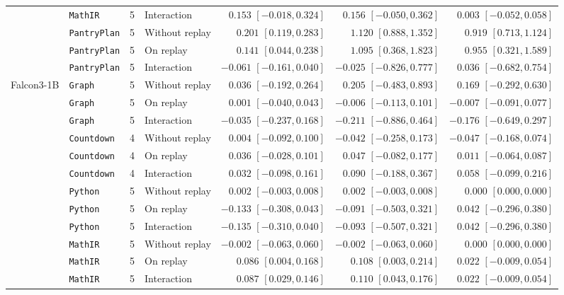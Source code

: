 \begin{table}[!htbp]
\begin{tabular}{llr l rrr}
 & \texttt{MathIR} & 5 & Interaction & $0.153$ $[-0.018, 0.324]$ & $0.156$ $[-0.050, 0.362]$ & $0.003$ $[-0.052, 0.058]$ \\
 & \texttt{PantryPlan} & 5 & Without replay & $0.201$ $[0.119, 0.283]$ & $1.120$ $[0.888, 1.352]$ & $0.919$ $[0.713, 1.124]$ \\
 & \texttt{PantryPlan} & 5 & On replay & $0.141$ $[0.044, 0.238]$ & $1.095$ $[0.368, 1.823]$ & $0.955$ $[0.321, 1.589]$ \\
 & \texttt{PantryPlan} & 5 & Interaction & $-0.061$ $[-0.161, 0.040]$ & $-0.025$ $[-0.826, 0.777]$ & $0.036$ $[-0.682, 0.754]$ \\
\midrule
Falcon3-1B & \texttt{Graph} & 5 & Without replay & $0.036$ $[-0.192, 0.264]$ & $0.205$ $[-0.483, 0.893]$ & $0.169$ $[-0.292, 0.630]$ \\
 & \texttt{Graph} & 5 & On replay & $0.001$ $[-0.040, 0.043]$ & $-0.006$ $[-0.113, 0.101]$ & $-0.007$ $[-0.091, 0.077]$ \\
 & \texttt{Graph} & 5 & Interaction & $-0.035$ $[-0.237, 0.168]$ & $-0.211$ $[-0.886, 0.464]$ & $-0.176$ $[-0.649, 0.297]$ \\
 & \texttt{Countdown} & 4 & Without replay & $0.004$ $[-0.092, 0.100]$ & $-0.042$ $[-0.258, 0.173]$ & $-0.047$ $[-0.168, 0.074]$ \\
 & \texttt{Countdown} & 4 & On replay & $0.036$ $[-0.028, 0.101]$ & $0.047$ $[-0.082, 0.177]$ & $0.011$ $[-0.064, 0.087]$ \\
 & \texttt{Countdown} & 4 & Interaction & $0.032$ $[-0.098, 0.161]$ & $0.090$ $[-0.188, 0.367]$ & $0.058$ $[-0.099, 0.216]$ \\
 & \texttt{Python} & 5 & Without replay & $0.002$ $[-0.003, 0.008]$ & $0.002$ $[-0.003, 0.008]$ & $0.000$ $[0.000, 0.000]$ \\
 & \texttt{Python} & 5 & On replay & $-0.133$ $[-0.308, 0.043]$ & $-0.091$ $[-0.503, 0.321]$ & $0.042$ $[-0.296, 0.380]$ \\
 & \texttt{Python} & 5 & Interaction & $-0.135$ $[-0.310, 0.040]$ & $-0.093$ $[-0.507, 0.321]$ & $0.042$ $[-0.296, 0.380]$ \\
 & \texttt{MathIR} & 5 & Without replay & $-0.002$ $[-0.063, 0.060]$ & $-0.002$ $[-0.063, 0.060]$ & $0.000$ $[0.000, 0.000]$ \\
 & \texttt{MathIR} & 5 & On replay & $0.086$ $[0.004, 0.168]$ & $0.108$ $[0.003, 0.214]$ & $0.022$ $[-0.009, 0.054]$ \\
 & \texttt{MathIR} & 5 & Interaction & $0.087$ $[0.029, 0.146]$ & $0.110$ $[0.043, 0.176]$ & $0.022$ $[-0.009, 0.054]$ \\

\end{tabular}
\end{table}
